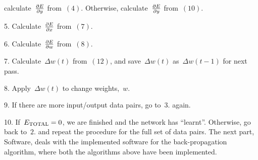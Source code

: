 calculate~$\partial E \over \partial y$ from~$(4)$. Otherwise,
calculate~$\partial E \over \partial y$ from~$(10)$.
\item {5.} Calculate~$\partial E \over \partial x$ from~$(7)$.
\item {6.} Calculate~$\partial E \over \partial w$ from~$(8)$.
\item {7.} Calculate~$\Delta w(t)$ from~$(12)$, and save~$\Delta
w(t)$ as~$\Delta w(t-1)$ for next pass.
\item {8.} Apply~$\Delta w(t)$ to change weights,~$w$.
\item {9.} If there are more input/output data pairs, go to~$3.$
again.
\item {10.} If~$E_{\rm TOTAL} = 0$, we are finished and the network
has ``learnt''.
Otherwise, go back to~$2.$ and repeat the procedure for the full set
of data pairs.
\smallskip
The next part, Software, deals with the implemented software for the
back-propagation algorithm, where both the algorithms above have
been implemented.
